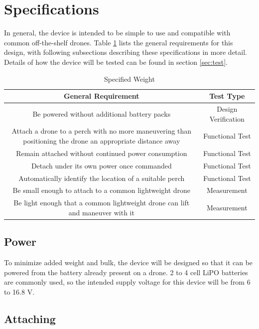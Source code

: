 \section{Specifications}

In general, the device is intended to be simple to use and compatible with common off-the-shelf drones. 
Table \ref{tab:spec} lists the general requirements for this design, with following subsections describing 
these specifications in more detail.
Details of how the device will be tested can be found in section \ref{sec:test}.

\begin{table}[H]
    \centering
    \caption{Specified Weight}
    \begin{tabular}{| c | c |}
        \hline
        {General Requirement} & {Test Type} \\
        \hline
        {Be powered without additional battery packs} & {Design Verification} \\
        {Attach a drone to a perch with no more maneuvering than positioning the drone an appropriate distance away} & {Functional Test} \\
        {Remain attached without continued power consumption} & {Functional Test} \\
        {Detach under its own power once commanded} & {Functional Test} \\
        {Automatically identify the location of a suitable perch} & {Functional Test} \\
        {Be small enough to attach to a common lightweight drone} & {Measurement} \\
        {Be light enough that a common lightweight drone can lift and maneuver with it} & {Measurement} \\
        \hline
    \end{tabular}
\label{tab:spec}
\end{table}

\subsection{Power}

To minimize added weight and bulk, the device will be designed so that it can be powered from the battery already present on 
a drone. 2 to 4 cell LiPO batteries are commonly used, so the intended supply voltage for this device will be from 6 to 16.8 V.

\subsection{Attaching}

